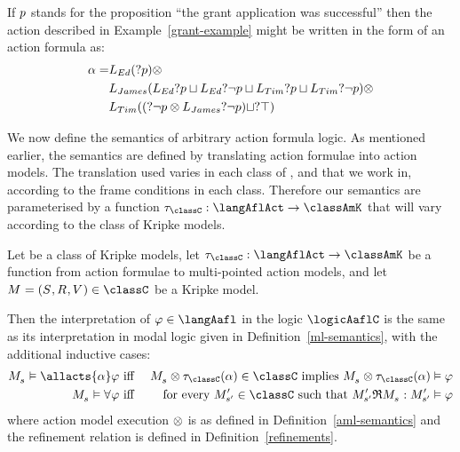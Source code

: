\begin{example}\label{grant-example-formula}
    If $p$ stands for the proposition ``the grant application was successful'' then the action described in Example~\ref{grant-example} might be written in the form of an action formula as:
    \begin{align*}
        \alpha = &L_{Ed} (?{p}) \otimes\\
        &L_{James} (L_{Ed} ?{p} \sqcup L_{Ed} ?{\neg p} \sqcup L_{Tim} ?{p} \sqcup L_{Tim} ?{\neg p}) \otimes\\
        &L_{Tim} ((?{\neg p} \otimes L_{James} ?{\neg p}) \sqcup ?{\top})
    \end{align*}
\end{example}

We now define the semantics of arbitrary action formula logic.
As mentioned earlier, the semantics are defined by translating action formulae into action models.
The translation used varies in each class of \classK{}, \classKFF{} and \classS{} that we work in, according to the frame conditions in each class.
Therefore our semantics are parameterised by a function $\tau_\classC: \langAflAct \to \classAmK$ that will vary according to the class of Kripke models.

\begin{definition}
    Let \classC{} be a class of Kripke models, let $\tau_\classC : \langAflAct \to \classAmK$ be a function from action formulae to multi-pointed action models, and let $\kModel = \kModelTuple \in \classC$ be a Kripke model.

    Then the interpretation of $\phi \in \langAafl$ in the logic $\logicAaflC$ is the same as its interpretation in modal logic given in Definition~\ref{ml-semantics}, with the additional inductive cases:
    \begin{eqnarray*}
        \kPModel{\kStateS} \entails \allacts{\alpha} \phi &\text{ iff }& \kPModel{\kStateS} \exec \tau_\classC(\alpha) \in \classC \text{ implies } \kPModel{\kStateS} \exec \tau_\classC(\alpha) \entails \phi\\
        \kPModel{\kStateS} \entails \allrefs \phi &\text{ iff }& \text{for every } \kPModel[\prime]{\kStateS[\prime]} \in \classC \text{ such that } \kPModel[\prime]{\kStateS[\prime]} \refinement \kPModel{\kStateS}: \kPModel[\prime]{\kStateS[\prime]} \entails \phi
    \end{eqnarray*}
    where action model execution $\otimes$ is as defined in Definition~\ref{aml-semantics} and the refinement relation is defined in Definition~\ref{refinements}.
\end{definition}


